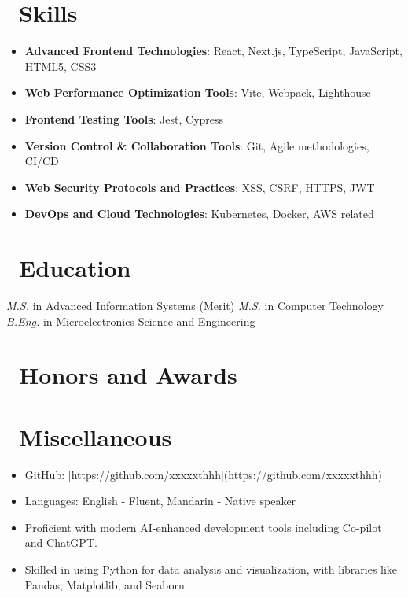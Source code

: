 \documentclass{resume}
\begin{document}
\section{\faCogs\ Skills}
\begin{itemize}[parsep=0.5ex]
  \item \textbf{Advanced Frontend Technologies}: React, Next.js, TypeScript, JavaScript, HTML5, CSS3
  \item \textbf{Web Performance Optimization Tools}: Vite, Webpack, Lighthouse
  \item \textbf{Frontend Testing Tools}: Jest, Cypress
  \item \textbf{Version Control \& Collaboration Tools}: Git, Agile methodologies, CI/CD
  \item \textbf{Web Security Protocols and Practices}: XSS, CSRF, HTTPS, JWT
  \item \textbf{DevOps and Cloud Technologies}: Kubernetes, Docker, AWS related 
\end{itemize}

\section{\faGraduationCap\ Education}
\textit{M.S.} in Advanced Information Systems (Merit)
\textit{M.S.} in Computer Technology
\textit{B.Eng.} in Microelectronics Science and Engineering

\section{\faHeartO\ Honors and Awards}

\section{\faInfo\ Miscellaneous}
\begin{itemize}[parsep=0.5ex]
  \item GitHub: [https://github.com/xxxxxthhh](https://github.com/xxxxxthhh)
  \item Languages: English - Fluent, Mandarin - Native speaker
  \item Proficient with modern AI-enhanced development tools including Co-pilot and ChatGPT.
  \item Skilled in using Python for data analysis and visualization, with libraries like Pandas, Matplotlib, and Seaborn.
\end{itemize}
\end{document}
